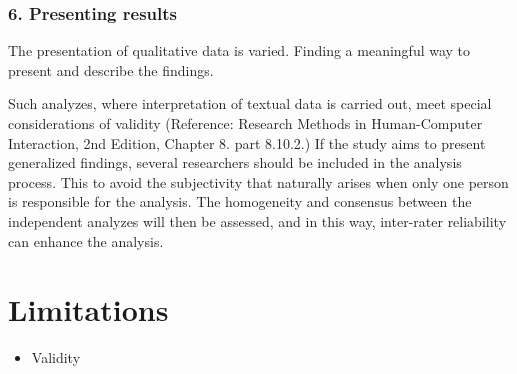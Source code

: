     \subsubsection{6. Presenting results}
    The presentation of qualitative data is varied. 
    Finding a meaningful way to present and describe the findings. 

Such analyzes, where interpretation of textual data is carried out, meet special considerations of validity (Reference: Research Methods in Human-Computer Interaction, 2nd Edition, Chapter 8. part 8.10.2.) If the study aims to present generalized findings, several researchers should be included in the analysis process. This to avoid the subjectivity that naturally arises when only one person is responsible for the analysis. The homogeneity and consensus between the independent analyzes will then be assessed, and in this way, inter-rater reliability can enhance the analysis.

\section{Limitations}

\begin{itemize}
\item Validity 
\end{itemize}


